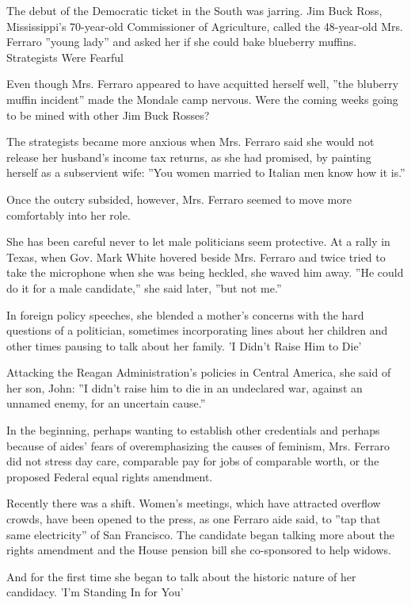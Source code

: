 The debut of the Democratic ticket in the South was jarring. Jim Buck
Ross, Mississippi's 70-year-old Commissioner of Agriculture, called the
48-year-old Mrs. Ferraro ''young lady'' and asked her if she could bake
blueberry muffins. Strategists Were Fearful

Even though Mrs. Ferraro appeared to have acquitted herself well, ''the
bluberry muffin incident'' made the Mondale camp nervous. Were the
coming weeks going to be mined with other Jim Buck Rosses?

The strategists became more anxious when Mrs. Ferraro said she would not
release her husband's income tax returns, as she had promised, by
painting herself as a subservient wife: ''You women married to Italian
men know how it is.''

Once the outcry subsided, however, Mrs. Ferraro seemed to move more
comfortably into her role.

She has been careful never to let male politicians seem protective. At a
rally in Texas, when Gov. Mark White hovered beside Mrs. Ferraro and
twice tried to take the microphone when she was being heckled, she waved
him away. ''He could do it for a male candidate,'' she said later, ''but
not me.''

In foreign policy speeches, she blended a mother's concerns with the
hard questions of a politician, sometimes incorporating lines about her
children and other times pausing to talk about her family. 'I Didn't
Raise Him to Die'

Attacking the Reagan Administration's policies in Central America, she
said of her son, John: ''I didn't raise him to die in an undeclared war,
against an unnamed enemy, for an uncertain cause.''

In the beginning, perhaps wanting to establish other credentials and
perhaps because of aides' fears of overemphasizing the causes of
feminism, Mrs. Ferraro did not stress day care, comparable pay for jobs
of comparable worth, or the proposed Federal equal rights amendment.

Recently there was a shift. Women's meetings, which have attracted
overflow crowds, have been opened to the press, as one Ferraro aide
said, to ''tap that same electricity'' of San Francisco. The candidate
began talking more about the rights amendment and the House pension bill
she co-sponsored to help widows.

And for the first time she began to talk about the historic nature of
her candidacy. 'I'm Standing In for You'

